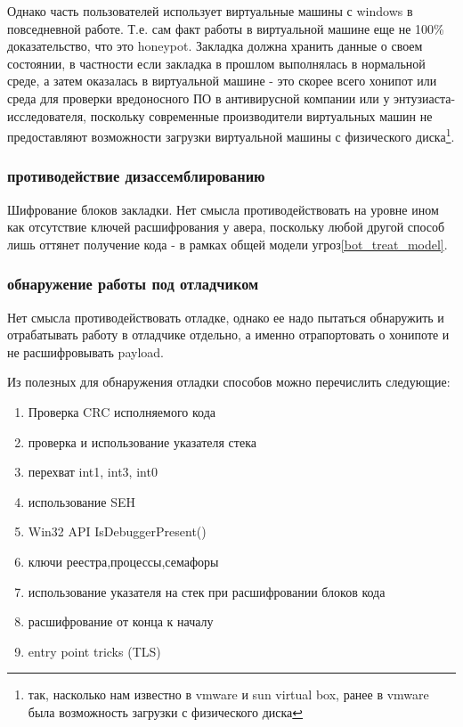 Однако часть пользователей использует виртуальные машины с windows в
повседневной работе. Т.е. сам факт работы в виртуальной машине еще не 100\%
доказательство, что это honeypot. Закладка должна хранить данные о своем
состоянии, в частности если закладка в прошлом выполнялась в нормальной
среде, а затем оказалась в виртуальной машине - это скорее всего хонипот
 или среда для проверки вредоносного ПО в антивирусной компании или у
энтузиаста-исследователя, поскольку современные производители виртуальных
 машин не предоставляют возможности загрузки виртуальной машины с физического
 диска\footnote{так, насколько нам известно в vmware и sun virtual box,
ранее в vmware была возможность загрузки с физического диска}.

\subsubsection{противодействие дизассемблированию}
\label{antihoneypot_crypto}
Шифрование блоков закладки. Нет смысла противодействовать на уровне ином как отсутствие ключей
расшифрования у авера, поскольку любой другой способ лишь оттянет получение кода - в рамках общей модели угроз\ref{bot_treat_model}.

\subsubsection{обнаружение работы под отладчиком}
Нет смысла противодействовать отладке, однако ее надо пытаться обнаружить и отрабатывать работу в отладчике отдельно, а именно отрапортовать о хонипоте и не расшифровывать payload.

Из полезных для обнаружения отладки способов можно перечислить следующие:
\begin{enumerate}
\item{Проверка CRC исполняемого кода}
\item{проверка и использование указателя стека}
\item{перехват int1, int3, int0}
\item{использование SEH}
\item{Win32 API IsDebuggerPresent()}
\item{ключи реестра,процессы,семафоры}
\item{использование указателя на стек при расшифровании блоков кода}
\item{расшифрование от конца к началу}
\item{entry point tricks (TLS)}
\end{enumerate}

